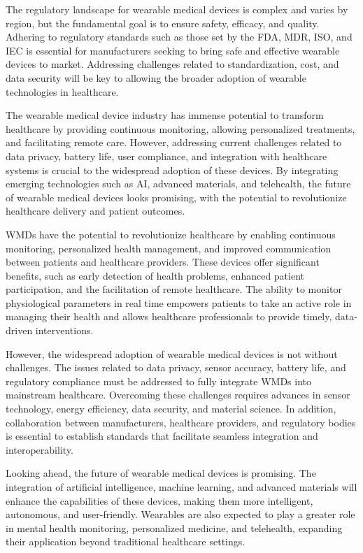 \documentclass[journal]{IEEEtran}
\begin{document}
The regulatory landscape for wearable medical devices is complex and varies by region, but the fundamental goal is to ensure safety, efficacy, and quality. Adhering to regulatory standards such as those set by the FDA, MDR, ISO, and IEC is essential for manufacturers seeking to bring safe and effective wearable devices to market. Addressing challenges related to standardization, cost, and data security will be key to allowing the broader adoption of wearable technologies in healthcare.

The wearable medical device industry has immense potential to transform healthcare by providing continuous monitoring, allowing personalized treatments, and facilitating remote care. However, addressing current challenges related to data privacy, battery life, user compliance, and integration with healthcare systems is crucial to the widespread adoption of these devices. By integrating emerging technologies such as AI, advanced materials, and telehealth, the future of wearable medical devices looks promising, with the potential to revolutionize healthcare delivery and patient outcomes.

WMDs have the potential to revolutionize healthcare by enabling continuous monitoring, personalized health management, and improved communication between patients and healthcare providers. These devices offer significant benefits, such as early detection of health problems, enhanced patient participation, and the facilitation of remote healthcare. The ability to monitor physiological parameters in real time empowers patients to take an active role in managing their health and allows healthcare professionals to provide timely, data-driven interventions.

However, the widespread adoption of wearable medical devices is not without challenges. The issues related to data privacy, sensor accuracy, battery life, and regulatory compliance must be addressed to fully integrate WMDs into mainstream healthcare. Overcoming these challenges requires advances in sensor technology, energy efficiency, data security, and material science. In addition, collaboration between manufacturers, healthcare providers, and regulatory bodies is essential to establish standards that facilitate seamless integration and interoperability.

Looking ahead, the future of wearable medical devices is promising. The integration of artificial intelligence, machine learning, and advanced materials will enhance the capabilities of these devices, making them more intelligent, autonomous, and user-friendly. Wearables are also expected to play a greater role in mental health monitoring, personalized medicine, and telehealth, expanding their application beyond traditional healthcare settings.
\end{document}
